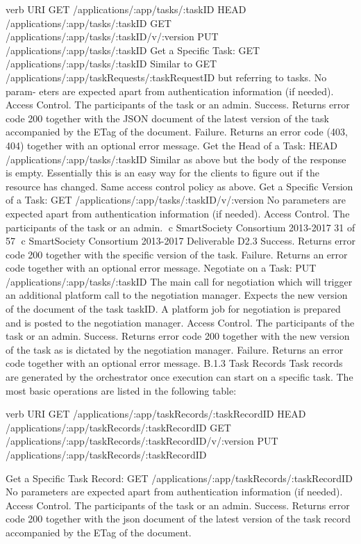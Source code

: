 verb
URI
GET
/applications/:app/tasks/:taskID
HEAD
/applications/:app/tasks/:taskID
GET
/applications/:app/tasks/:taskID/v/:version
PUT
/applications/:app/tasks/:taskID
Get a Specific Task: GET /applications/:app/tasks/:taskID Similar to GET /applications/:app/taskRequests/:taskRequestID but referring to tasks. No param- eters are expected apart from authentication information (if needed).
Access Control. The participants of the task or an admin.
Success. Returns error code 200 together with the JSON document of the latest
version of the task accompanied by the ETag of the document.
Failure. Returns an error code (403, 404) together with an optional error message.
Get the Head of a Task: HEAD /applications/:app/tasks/:taskID Similar as above but the body of the response is empty. Essentially this is an easy way for the clients to figure out if the resource has changed. Same access control policy as above.
Get a Specific Version of a Task:
GET /applications/:app/tasks/:taskID/v/:version No parameters are expected apart from authentication information (if needed).
Access Control. The participants of the task or an admin.
⃝c SmartSociety Consortium 2013-2017 31 of 57
⃝c SmartSociety Consortium 2013-2017 Deliverable D2.3 Success. Returns error code 200 together with the specific version of the task.
Failure. Returns an error code together with an optional error message.
Negotiate on a Task: PUT /applications/:app/tasks/:taskID The main call for negotiation which will trigger an additional platform call to the negotiation manager. Expects the new version of the document of the task taskID. A platform job for negotiation is prepared and is posted to the negotiation manager.
Access Control. The participants of the task or an admin.
Success. Returns error code 200 together with the new version of the task as is
dictated by the negotiation manager.
Failure. Returns an error code together with an optional error message.
B.1.3 Task Records
Task records are generated by the orchestrator once execution can start on a specific task. The most basic operations are listed in the following table:
 
verb
URI
GET
/applications/:app/taskRecords/:taskRecordID
HEAD
/applications/:app/taskRecords/:taskRecordID
GET
/applications/:app/taskRecords/:taskRecordID/v/:version
PUT
/applications/:app/taskRecords/:taskRecordID

Get a Specific Task Record:
GET /applications/:app/taskRecords/:taskRecordID No parameters are expected apart from authentication information (if needed).
Access Control. The participants of the task or an admin.
Success. Returns error code 200 together with the json document of the latest version
of the task record accompanied by the ETag of the document.

